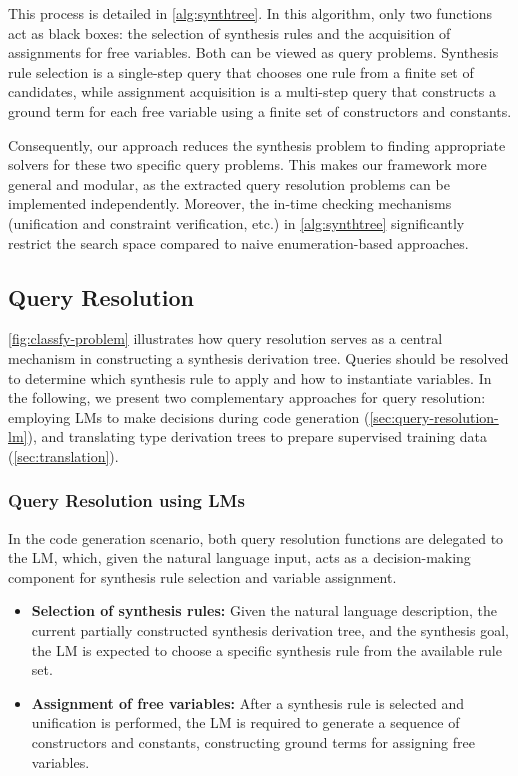 \documentclass[manuscript,screen]{acmart}
\begin{document}
This process is detailed in \autoref{alg:synthtree}. In this algorithm, only two functions act as black boxes: the selection of synthesis rules and the acquisition of assignments for free variables. Both can be viewed as query problems. Synthesis rule selection is a single-step query that chooses one rule from a finite set of candidates, while assignment acquisition is a multi-step query that constructs a ground term for each free variable using a finite set of constructors and constants.

Consequently, our approach reduces the synthesis problem to finding appropriate solvers for these two specific query problems. This makes our framework more general and modular, as the extracted query resolution problems can be implemented independently. 
Moreover, the in-time checking mechanisms (unification and constraint verification, etc.) in \autoref{alg:synthtree} significantly restrict the search space compared to naive enumeration-based approaches. 

\subsection{Query Resolution}
\autoref{fig:classfy-problem} illustrates how query resolution serves as a central mechanism in constructing a synthesis derivation tree. Queries should be resolved to determine which synthesis rule to apply and how to instantiate variables. In the following, we present two complementary approaches for query resolution: employing LMs to make decisions during code generation (\autoref{sec:query-resolution-lm}), and translating type derivation trees to prepare supervised training data (\autoref{sec:translation}).

\subsubsection{Query Resolution using LMs}
\label{sec:query-resolution-lm}
In the code generation scenario, both query resolution functions are delegated to the LM, which, given the natural language input, acts as a decision-making component for synthesis rule selection and variable assignment.

\begin{itemize}
  \item \textbf{Selection of synthesis rules:} Given the natural language description, the current partially constructed synthesis derivation tree, and the synthesis goal, the LM is expected to choose a specific synthesis rule from the available rule set.

  \item \textbf{Assignment of free variables:} After a synthesis rule is selected and unification is performed, the LM is required to generate a sequence of constructors and constants, constructing ground terms for assigning free variables. 
\end{itemize}
\end{document}
